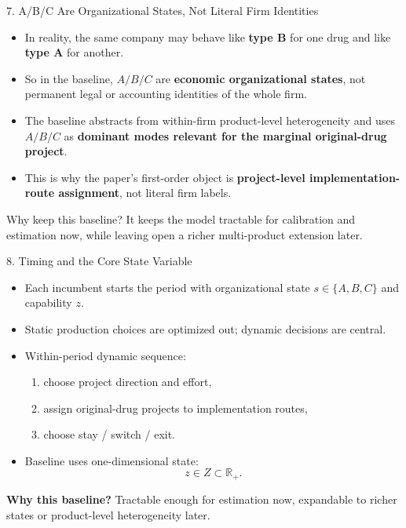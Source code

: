 \documentclass[aspectratio=169,11pt]{beamer}
\begin{document}
\begin{frame}{7. A/B/C Are Organizational States, Not Literal Firm Identities}
\begin{itemize}
    \item In reality, the same company may behave like \textbf{type B} for one drug and like \textbf{type A} for another.
    \item So in the baseline, \(A/B/C\) are \textbf{economic organizational states}, not permanent legal or accounting identities of the whole firm.
    \item The baseline abstracts from within-firm product-level heterogeneity and uses \(A/B/C\) as \textbf{dominant modes relevant for the marginal original-drug project}.
    \item This is why the paper's first-order object is \textbf{project-level implementation-route assignment}, not literal firm labels.
\end{itemize}

\vspace{0.25cm}
\begin{block}{Why keep this baseline?}
It keeps the model tractable for calibration and estimation now, while leaving open a richer multi-product extension later.
\end{block}
\end{frame}

\begin{frame}{8. Timing and the Core State Variable}
\begin{itemize}
    \item Each incumbent starts the period with organizational state \(s\in\{A,B,C\}\) and capability \(z\).
    \item Static production choices are optimized out; dynamic decisions are central.
    \item Within-period dynamic sequence:
    \begin{enumerate}
        \item choose project direction and effort,
        \item assign original-drug projects to implementation routes,
        \item choose stay / switch / exit.
    \end{enumerate}
    \item Baseline uses one-dimensional state:
    \[
    z\in Z\subset\mathbb{R}_+.
    \]
\end{itemize}

\vspace{0.25cm}
\textbf{Why this baseline?} Tractable enough for estimation now, expandable to richer states or product-level heterogeneity later.
\end{frame}
\end{document}
